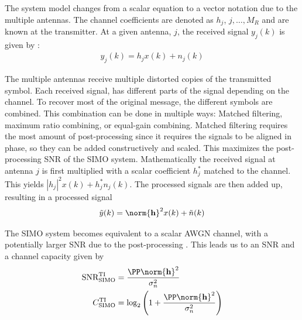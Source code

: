 The system model changes from a scalar equation to a vector notation due to the multiple antennas. The channel coefficients are denoted as $h_j$, $j,\ldots,M_R$ and are known at the transmitter. At a given antenna, $j$, the received signal $y_j(k)$ is given by \cite{Tim2012Practical}: 
\begin{align} %
  y_j(k) = h_j x(k) + n_j(k)
\end{align}

The multiple antennas receive multiple distorted copies of the transmitted symbol. Each received signal, has different parts of the signal depending on the channel. To recover most of the original message, the different symbols are combined. This combination can be done in multiple ways: Matched filtering, maximum ratio combining, or equal-gain combining. Matched filtering requires the most amount of post-processing since it requires the signals to be aligned in phase, so they can be added constructively and scaled. This maximizes the post-processing SNR of the SIMO system. Mathematically the received signal at antenna $j$ is first multiplied with a scalar coefficient $h_j^*$ matched to the channel. This yields $|h_j|^2 x(k) + h_j^* n_j(k)$. The processed signals are then added up, resulting in a processed signal \cite{Tim2012Practical} 
\begin{align}%
  \tilde{y}(k) = \norm{\mathbf{h}}^2 x(k) + \tilde{n}(k)
\end{align}

The SIMO system becomes equivalent to a scalar AWGN channel, with a potentially larger SNR due to the post-processing \cite{Tim2012Practical}. This leads us to an SNR and a channel capacity given by \cite{Tim2012Practical}
\begin{align} %
\text{SNR}^{\text{TI}}_{\text{SIMO}} &= \frac{\PP \norm{\mathbf{h}}^2}{\sigma^2_n} \\
C^{\text{TI}}_{\text{SIMO}} &= \log_2 \left( 1+\frac{\PP \norm{\mathbf{h}}^2}{\sigma^2_n} \right)  
\end{align}

